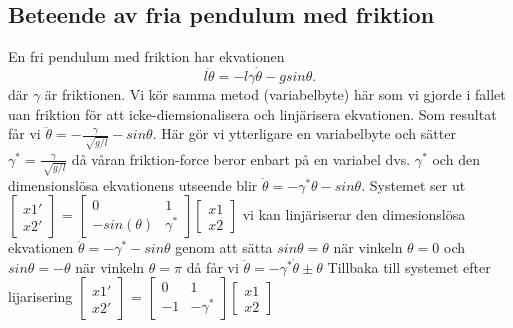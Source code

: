 \documentclass{article}
\begin{document}
\subsection{Beteende av fria pendulum med friktion}
En fri pendulum med friktion har ekvationen \begin{equation}
l\ddot{\theta} = -l{\gamma}\dot{\theta} - g sin{\theta}. \end{equation}
där ${\gamma}$ är friktionen. \newline 
Vi kör samma metod (variabelbyte) här som vi gjorde i fallet uan friktion för att icke-diemsionalisera och linjärisera ekvationen. \newline
Som resultat får vi $\ddot{\theta} = -\frac{\gamma}{\sqrt[]{g/l}} - sin{\theta} $. Här gör vi ytterligare en variabelbyte och sätter $ {\gamma^{*}} = \frac{\gamma}{\sqrt[]{g/l}}$ då våran friktion-force beror enbart på en variabel dvs. ${\gamma^{*}}$ och den dimensionslösa ekvationens utseende blir $\ddot{\theta} = -{\gamma^{*}{\theta}} - sin{\theta}. $ \newline
Systemet ser ut  \newline $ \begin{bmatrix} x1' \\ x2' \end{bmatrix} $ =  $ \begin{bmatrix} 0 & 1 \\ -sin({\theta}) & {\gamma^{*}} \end{bmatrix} \begin{bmatrix} x1 \\ x2 \end{bmatrix}$ \newline
vi kan linjäriserar den dimesionslösa ekvationen $\ddot{\theta} = -{\gamma^{*}} -sin{\theta} $ genom att sätta $sin{\theta} = {\theta}$ när vinkeln ${\theta} = 0$ och $sin{\theta} = -{\theta}$ när vinkeln $ {\theta} =  {\pi} $ då får vi \newline $\ddot{\theta} = -{\gamma^{*}\dot{\theta}} \pm {\theta} $ \newline
Tillbaka till systemet efter lijarisering $ \begin{bmatrix} x1' \\ x2' \end{bmatrix} $ =  $ \begin{bmatrix} 0 & 1 \\ -1 & -{\gamma^{*}} \end{bmatrix} \begin{bmatrix} x1 \\ x2 \end{bmatrix}$
\end{document}
